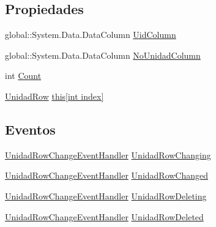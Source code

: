 \subsection*{Propiedades}
\begin{DoxyCompactItemize}
\item 
global\-::\-System.\-Data.\-Data\-Column \hyperlink{class_proyecto___integrador__3_1_1ds_unidad_1_1_unidad_data_table_a671279064b0207bdb3a67b438e9a01b8}{Uid\-Column}
\item 
global\-::\-System.\-Data.\-Data\-Column \hyperlink{class_proyecto___integrador__3_1_1ds_unidad_1_1_unidad_data_table_a60fca63e0242eacb5a1c7aaf65c7f36b}{No\-Unidad\-Column}
\item 
int \hyperlink{class_proyecto___integrador__3_1_1ds_unidad_1_1_unidad_data_table_aed99128b72fd2e0373199e48490fd8de}{Count}
\item 
\hyperlink{class_proyecto___integrador__3_1_1ds_unidad_1_1_unidad_row}{Unidad\-Row} \hyperlink{class_proyecto___integrador__3_1_1ds_unidad_1_1_unidad_data_table_addb75c1820ba9a4ab07cbdb53f137101}{this\mbox{[}int index\mbox{]}}
\end{DoxyCompactItemize}
\subsection*{Eventos}
\begin{DoxyCompactItemize}
\item 
\hyperlink{class_proyecto___integrador__3_1_1ds_unidad_a351cda84e90913df1583510ff35bd48d}{Unidad\-Row\-Change\-Event\-Handler} \hyperlink{class_proyecto___integrador__3_1_1ds_unidad_1_1_unidad_data_table_ab01abae070a2fb19b057c5e2dbe87f8d}{Unidad\-Row\-Changing}
\item 
\hyperlink{class_proyecto___integrador__3_1_1ds_unidad_a351cda84e90913df1583510ff35bd48d}{Unidad\-Row\-Change\-Event\-Handler} \hyperlink{class_proyecto___integrador__3_1_1ds_unidad_1_1_unidad_data_table_a7186e05ec5ef85ccc864cacebf9e9145}{Unidad\-Row\-Changed}
\item 
\hyperlink{class_proyecto___integrador__3_1_1ds_unidad_a351cda84e90913df1583510ff35bd48d}{Unidad\-Row\-Change\-Event\-Handler} \hyperlink{class_proyecto___integrador__3_1_1ds_unidad_1_1_unidad_data_table_ac4a46812a8ff7e0d3de13e8b0a9be97a}{Unidad\-Row\-Deleting}
\item 
\hyperlink{class_proyecto___integrador__3_1_1ds_unidad_a351cda84e90913df1583510ff35bd48d}{Unidad\-Row\-Change\-Event\-Handler} \hyperlink{class_proyecto___integrador__3_1_1ds_unidad_1_1_unidad_data_table_a897e816c0d55230fc12958212955971f}{Unidad\-Row\-Deleted}
\end{DoxyCompactItemize}

